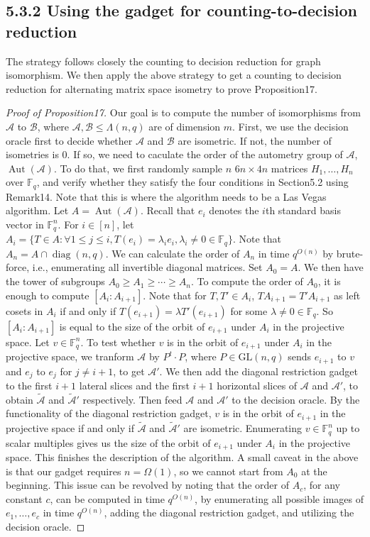 \documentclass[10pt,a4paper]{article}
\begin{document}
\subsection*{5.3.2 Using the gadget for counting-to-decision reduction}
The strategy follows closely the counting to decision reduction for graph isomorphism. We then apply the above strategy to get a counting to decision reduction for alternating matrix space isometry to prove Proposition17.
\begin{proof}[Proof of Proposition17]
Our goal is to compute the number of isomorphisms from $\mathcal A$ to $\mathcal B$, where $\mathcal A,\mathcal B\le\Lambda(n,q)$ are of dimension $m$. First, we use the decision oracle first to decide whether $\mathcal A$ and $\mathcal B$ are isometric. If not, the number of isometries is 0. If so, we need to caculate the order of the autometry group of $\mathcal A$, $\operatorname{Aut}(\mathcal A)$. To do that, we first randomly sample $n$ $6n\times4n$ matrices $H_1,\ldots,H_n$ over $\mathbb F_q$, and verify whether they satisfy the four conditions in Section5.2 using Remark14. Note that this is where the algorithm needs to be a Las Vegas algorithm.
Let $A=\operatorname{Aut}(\mathcal A)$. Recall that $e_i$ denotes the $i$th standard basis vector in $\mathbb F_q^n$. For $i\in[n]$, let $A_i=\{T\in A:\forall1\le j\le i,T(e_i)=\lambda_ie_i,\lambda_i\ne0\in\mathbb F_q\}$. Note that $A_n=A\cap\operatorname{diag}(n,q)$. We can calculate the order of $A_n$ in time $q^{O(n)}$ by brute-force, i.e., enumerating all invertible diagonal matrices. Set $A_0=A$. We then have the tower of subgroups $A_0\ge A_1\ge\cdots\ge A_n$.
To compute the order of $A_0$, it is enough to compute $[A_i:A_{i+1}]$. Note that for $T,T'\in A_i$, $TA_{i+1}=T'A_{i+1}$ as left cosets in $A_i$ if and only if $T(e_{i+1})=\lambda T'(e_{i+1})$ for some $\lambda\ne0\in\mathbb F_q$. So $[A_i:A_{i+1}]$ is equal to the size of the orbit of $e_{i+1}$ under $A_i$ in the projective space. Let $v\in\mathbb F_q^n$. To test whether $v$ is in the orbit of $e_{i+1}$ under $A_i$ in the projective space, we tranform $\mathcal A$ by $P^t\cdot P$, where $P\in\mathrm{GL}(n,q)$ sends $e_{i+1}$ to $v$ and $e_j$ to $e_j$ for $j\ne i+1$, to get $\mathcal A'$. We then add the diagonal restriction gadget to the first $i+1$ lateral slices and the first $i+1$ horizontal slices of $\mathcal A$ and $\mathcal A'$, to obtain $\widetilde{\mathcal A}$ and $\widetilde{\mathcal A}'$ respectively. Then feed $\mathcal A$ and $\mathcal A'$ to the decision oracle. By the functionality of the diagonal restriction gadget, $v$ is in the orbit of $e_{i+1}$ in the projective space if and only if $\widetilde{\mathcal A}$ and $\widetilde{\mathcal A}'$ are isometric. Enumerating $v\in\mathbb F_q^n$ up to scalar multiples gives us the size of the orbit of $e_{i+1}$ under $A_i$ in the projective space. This finishes the description of the algorithm.
A small caveat in the above is that our gadget requires $n=\Omega(1)$, so we cannot start from $A_0$ at the beginning. This issue can be revolved by noting that the order of $A_c$, for any constant $c$, can be computed in time $q^{O(n)}$, by enumerating all possible images of $e_1,\ldots,e_c$ in time $q^{O(n)}$, adding the diagonal restriction gadget, and utilizing the decision oracle.
\end{proof}
\end{document}
